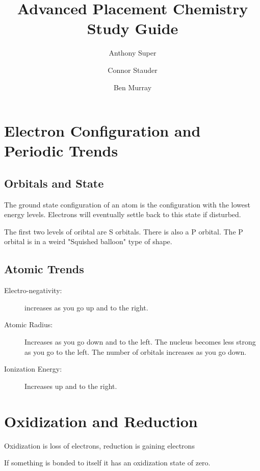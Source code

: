 \documentclass[]{article}
\begin{document}
\title{Advanced Placement Chemistry Study Guide}
\author{Anthony Super \and Connor Stauder \and Ben Murray}
\maketitle
\tableofcontents
\section{Electron Configuration and Periodic Trends}
\subsection{Orbitals and State}
The ground state configuration of an atom is the configuration with the lowest energy levels. Electrons will eventually settle back to this state if disturbed.

The first two levels of oribtal are S orbitals. There is also a P orbital. The P orbital is in a weird "Squished balloon" type of shape.

\subsection{Atomic Trends}
\begin{description}
\item[Electro-negativity:] increases as you go up and to the right.
\item[Atomic Radius:] Increases as you go down and to the left. The nucleus becomes less strong as you go to the left. The number of orbitals increases as you go down.
\item[Ionization Energy:] Increases up and to the right. 
\end{description}
\section{Oxidization and Reduction}
Oxidization is loss of electrons, reduction is gaining electrons

If something is bonded to itself it has an oxidization state of zero.
\end{document}
